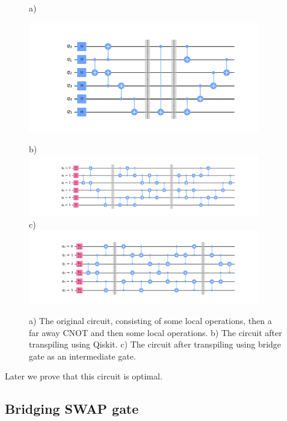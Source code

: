 \documentclass{report}
\begin{document}
  \begin{figure}[h]
    a) \\
    \begin{center}
    \includegraphics[width=0.9\textwidth]{../code/expm_1_bridge/out/original_circuit}
    \end{center}
    b) \\
    \includegraphics[width=0.9\textwidth]{../code/expm_1_bridge/out/transpiled_circuit_swap} \\
    c) \\
    \includegraphics[width=0.9\textwidth]{../code/expm_1_bridge/out/transpiled_circuit_bridge}
    \caption{a) The original circuit, consisting of some local operations, then a far away CNOT and then some local operations. b) The circuit after transpiling using Qiskit. c) The circuit after transpiling using bridge gate as an intermediate gate.}
  \end{figure}

    Later we prove that this circuit is optimal.

\subsection*{Bridging SWAP gate}
\end{document}
